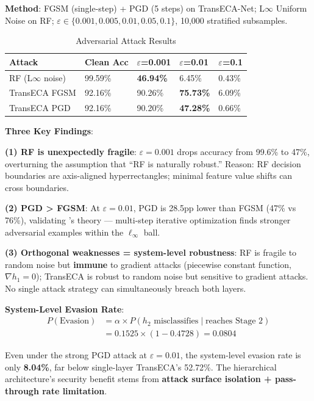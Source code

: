 \documentclass[sigconf]{acmart}
\begin{document}
\textbf{Method}: FGSM \cite{24} (single-step) + PGD \cite{13} (5 steps) on TransECA-Net; L$\infty$ Uniform Noise on RF; $\varepsilon \in \{0.001, 0.005, 0.01, 0.05, 0.1\}$, 10,000 stratified subsamples.

\begin{table}[H]
\caption{Adversarial Attack Results}
\label{tab:adversarial}
\begin{tabular}{lllll}
\toprule
\textbf{Attack} & \textbf{Clean Acc} & \textbf{$\varepsilon$=0.001} & \textbf{$\varepsilon$=0.01} & \textbf{$\varepsilon$=0.1} \\
\midrule
RF (L$\infty$ noise) & 99.59\% & \textbf{46.94\%} & 6.45\% & 0.43\% \\
TransECA FGSM & 92.16\% & 90.26\% & \textbf{75.73\%} & 6.09\% \\
TransECA PGD & 92.16\% & 90.20\% & \textbf{47.28\%} & 0.66\% \\
\bottomrule
\end{tabular}
\end{table}

\textbf{Three Key Findings}:

\textbf{(1) RF is unexpectedly fragile}: $\varepsilon = 0.001$ drops accuracy from 99.6\% to 47\%, overturning the assumption that ``RF is naturally robust.'' Reason: RF decision boundaries are axis-aligned hyperrectangles; minimal feature value shifts can cross boundaries.

\textbf{(2) PGD > FGSM}: At $\varepsilon = 0.01$, PGD is 28.5pp lower than FGSM (47\% vs 76\%), validating \cite{13}'s theory --- multi-step iterative optimization finds stronger adversarial examples within the $\ell_\infty$ ball.

\textbf{(3) Orthogonal weaknesses = system-level robustness}: RF is fragile to random noise but \textbf{immune} to gradient attacks (piecewise constant function, $\nabla h_1 = 0$); TransECA is robust to random noise but sensitive to gradient attacks. No single attack strategy can simultaneously breach both layers.

\textbf{System-Level Evasion Rate}:
\begin{align*}
P(\text{Evasion}) &= \alpha \times P(h_2 \text{ misclassifies} \mid \text{reaches Stage 2}) \\
                  &= 0.1525 \times (1 - 0.4728) = \mathbf{0.0804}
\end{align*}

Even under the strong PGD attack at $\varepsilon = 0.01$, the system-level evasion rate is only \textbf{8.04\%}, far below single-layer TransECA's 52.72\%. The hierarchical architecture's security benefit stems from \textbf{attack surface isolation + pass-through rate limitation}.
\end{document}
